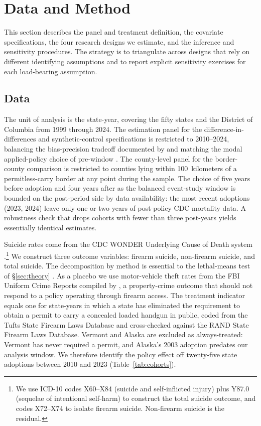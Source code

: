 \documentclass[12pt]{article}
\begin{document}
\section{Data and Method}\label{sec:method}

This section describes the panel and treatment definition, the
covariate specifications, the four research designs we estimate,
and the inference and sensitivity procedures. The strategy is
to triangulate across designs that rely on different identifying
assumptions and to report explicit sensitivity exercises for each
load-bearing assumption.

\subsection{Data}\label{sec:panel}

The unit of analysis is the state-year, covering the fifty states
and the District of Columbia from 1999 through 2024. The estimation
panel for the difference-in-differences and synthetic-control
specifications is restricted to 2010--2024, balancing the
bias-precision tradeoff documented by \citet{rothsantanna2023} and
matching the modal applied-policy choice of pre-window
\citep{donohue2019, cheng2013}. The county-level panel for the
border-county comparison is restricted to counties lying within
100~kilometers of a permitless-carry border at any point during the
sample. The choice of five years before adoption and four years
after as the balanced event-study window is bounded on the
post-period side by data availability: the most recent adoptions
(2023, 2024) leave only one or two years of post-policy CDC
mortality data. A robustness check that drops cohorts with fewer
than three post-years yields essentially identical estimates.

Suicide rates come from the CDC WONDER Underlying Cause of Death
system \citep{cdcwonder}.\footnote{We use ICD-10 codes X60--X84
(suicide and self-inflicted injury) plus Y87.0 (sequelae of
intentional self-harm) to construct the total suicide outcome, and
codes X72--X74 to isolate firearm suicide. Non-firearm suicide is
the residual.} We construct three outcome variables: firearm
suicide, non-firearm suicide, and total suicide. The decomposition
by method is essential to the lethal-means test of §\ref{sec:theory}
\citep{crifasi2015, kivisto2018}. As a placebo we use motor-vehicle
theft rates from the FBI Uniform Crime Reports compiled by
\citet{kaplanleoka}, a property-crime outcome that should not
respond to a policy operating through firearm access. The
treatment indicator equals one for state-years in which a state has
eliminated the requirement to obtain a permit to carry a concealed
loaded handgun in public, coded from the Tufts State Firearm Laws
Database \citep{tuftsdata} and cross-checked against the RAND State
Firearm Laws Database. Vermont and Alaska are excluded as
always-treated: Vermont has never required a permit, and Alaska's
2003 adoption predates our analysis window. We therefore identify
the policy effect off twenty-five state adoptions between 2010 and
2023 (Table~\ref{tab:cohorts}).
\end{document}
